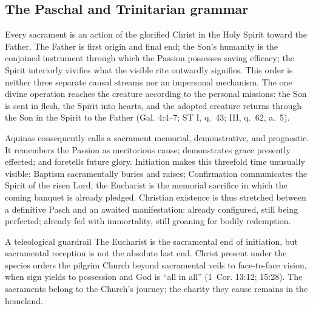 \subsection{The Paschal and Trinitarian grammar}

Every sacrament is an action of the glorified Christ in the Holy Spirit toward the Father. The Father is first origin and final end; the Son's humanity is the conjoined instrument through which the Passion possesses saving efficacy; the Spirit interiorly vivifies what the visible rite outwardly signifies. This order is neither three separate causal streams nor an impersonal mechanism. The one divine operation reaches the creature according to the personal missions: the Son is sent in flesh, the Spirit into hearts, and the adopted creature returns through the Son in the Spirit to the Father (Gal. 4:4--7; ST I, q.~43; III, q.~62, a.~5).

Aquinas consequently calls a sacrament memorial, demonstrative, and prognostic. It remembers the Passion as meritorious cause; demonstrates grace presently effected; and foretells future glory. Initiation makes this threefold time unusually visible: Baptism sacramentally buries and raises; Confirmation communicates the Spirit of the risen Lord; the Eucharist is the memorial sacrifice in which the coming banquet is already pledged. Christian existence is thus stretched between a definitive Pasch and an awaited manifestation: already configured, still being perfected; already fed with immortality, still groaning for bodily redemption.

\begin{studybox}{A teleological guardrail}
The Eucharist is the sacramental end of initiation, but sacramental reception is not the absolute last end. Christ present under the species orders the pilgrim Church beyond sacramental veils to face-to-face vision, when sign yields to possession and God is ``all in all'' (1~Cor. 13:12; 15:28). The sacraments belong to the Church's journey; the charity they cause remains in the homeland.
\end{studybox}

